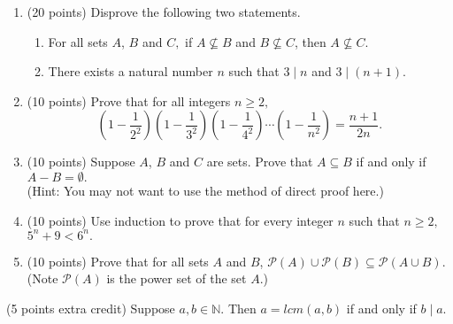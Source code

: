 \documentclass[11pt]{article}
\begin{document}
\begin{enumerate}
\item (20  points) Disprove the following two statements.
	\begin{enumerate}
	\item For all sets $A$, $B$ and $C,$ if $A \not\subseteq B$ and $B \not\subseteq C$, then $A \not\subseteq C.$
	\vfill
	\item There exists a natural number $n$ such that $3 \mid n$ and $3 \mid (n+1).$
	\vfill	
	\end{enumerate}
\newpage


\item (10 points) Prove that for all integers $n\geq 2,$ 
$$\left(1-\frac{1}{2^2} \right)\left( 1-\frac{1}{3^2} \right)\left( 1-\frac{1}{4^2} \right)\cdots\left(1-\frac{1}{n^2}  \right) =\frac{n+1}{2n}.$$
\vfill
\newpage
\item (10 points) Suppose $A$, $B$ and $C$ are sets. Prove that $A \subseteq B$ if and only if $A-B=\emptyset.$\\
(Hint: You may not want to use the method of direct proof here.)
\vfill
\newpage
\item (10 points) Use induction to prove that for every integer $n$ such that $n\geq2,$ $5^n+9 < 6^n.$
\vfill
\newpage
\item (10 points) Prove that for all sets $A$ and $B$, $\mathcal{P}(A) \cup \mathcal{P}(B) \subseteq \mathcal{P}(A \cup B).$ (Note $\mathcal{P}(A)$ is the power set of the set $A.$)
\end{enumerate}
\vfill
(5 points extra credit) Suppose $a,b \in \mathbb{N}.$ Then $a=lcm(a,b)$ if and only if $b \mid a.$
\vfill
\end{document}
